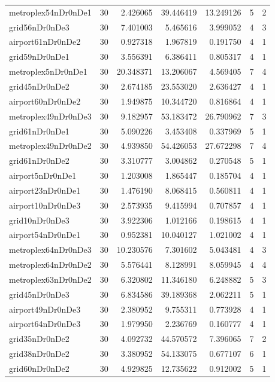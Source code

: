 \begin{longtable}{|l|r|r|r|r|r|r|}
metroplex54nDr0nDe1 & 30 & 2.426065 & 39.446419 & 13.249126 & 5 & 2 \\
grid56nDr0nDe3 & 30 & 7.401003 & 5.465616 & 3.999052 & 4 & 3 \\
airport61nDr0nDe2 & 30 & 0.927318 & 1.967819 & 0.191750 & 4 & 1 \\
grid59nDr0nDe1 & 30 & 3.556391 & 6.386411 & 0.805317 & 4 & 1 \\
metroplex5nDr0nDe1 & 30 & 20.348371 & 13.206067 & 4.569405 & 7 & 4 \\
grid45nDr0nDe2 & 30 & 2.674185 & 23.553020 & 2.636427 & 4 & 1 \\
airport60nDr0nDe2 & 30 & 1.949875 & 10.344720 & 0.816864 & 4 & 1 \\
metroplex49nDr0nDe3 & 30 & 9.182957 & 53.183472 & 26.790962 & 7 & 3 \\
grid61nDr0nDe1 & 30 & 5.090226 & 3.453408 & 0.337969 & 5 & 1 \\
metroplex49nDr0nDe2 & 30 & 4.939850 & 54.426053 & 27.672298 & 7 & 4 \\
grid61nDr0nDe2 & 30 & 3.310777 & 3.004862 & 0.270548 & 5 & 1 \\
airport5nDr0nDe1 & 30 & 1.203008 & 1.865447 & 0.185704 & 4 & 1 \\
airport23nDr0nDe1 & 30 & 1.476190 & 8.068415 & 0.560811 & 4 & 1 \\
airport10nDr0nDe3 & 30 & 2.573935 & 9.415994 & 0.707857 & 4 & 1 \\
grid10nDr0nDe3 & 30 & 3.922306 & 1.012166 & 0.198615 & 4 & 1 \\
airport54nDr0nDe1 & 30 & 0.952381 & 10.040127 & 1.021002 & 4 & 1 \\
metroplex64nDr0nDe3 & 30 & 10.230576 & 7.301602 & 5.043481 & 4 & 3 \\
metroplex64nDr0nDe2 & 30 & 5.576441 & 8.128991 & 8.059945 & 4 & 4 \\
metroplex63nDr0nDe2 & 30 & 6.320802 & 11.346180 & 6.248882 & 5 & 3 \\
grid45nDr0nDe3 & 30 & 6.834586 & 39.189368 & 2.062211 & 5 & 1 \\
airport49nDr0nDe3 & 30 & 2.380952 & 9.755311 & 0.773928 & 4 & 1 \\
airport64nDr0nDe3 & 30 & 1.979950 & 2.236769 & 0.160777 & 4 & 1 \\
grid35nDr0nDe2 & 30 & 4.092732 & 44.570572 & 7.396065 & 7 & 2 \\
grid38nDr0nDe2 & 30 & 3.380952 & 54.133075 & 0.677107 & 6 & 1 \\
grid60nDr0nDe2 & 30 & 4.929825 & 12.735622 & 0.912002 & 5 & 1 \\

\end{longtable}
